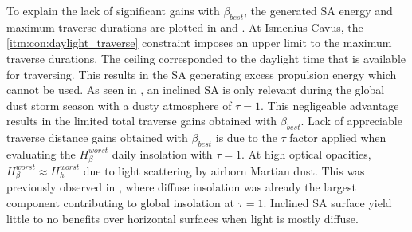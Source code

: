 To explain the lack of significant gains with $\beta_{best}$, the generated \ac{SA} energy and maximum traverse durations are plotted in  and . At Ismenius Cavus, the \ref{itm:con:daylight_traverse} constraint imposes an upper limit to the maximum traverse durations. The ceiling corresponded to the daylight time that is available for traversing. This results in the \ac{SA} generating excess propulsion energy which cannot be used. As seen in , an inclined \ac{SA} is only relevant during the global dust storm season with a dusty atmosphere of $\tau = 1$. This negligeable advantage results in the limited total traverse gains obtained with $\beta_{best}$. Lack of appreciable traverse distance gains obtained with $\beta_{best}$ is due to the $\tau$ factor applied when evaluating the $H_{\beta}^{worst}$ daily insolation with $\tau = 1$. At high optical opacities, $H_{\beta}^{worst} \approx H_{h}^{worst}$ due to light scattering by airborn Martian dust. This was previously observed in , where diffuse insolation was already the largest component contributing to global insolation at $\tau = 1$. Inclined \ac{SA} surface yield little to no benefits over horizontal surfaces when light is mostly diffuse.

